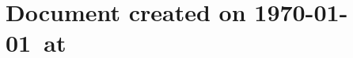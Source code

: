 \documentclass[a4paper]{book}
\begin{document}
% 
 
% 
% 
% 
% 
% 
% 
% 
% 
% 
% 
% 
% 

% 
\chapter*{Document created on \today~at \xxivtime}
\end{document}
